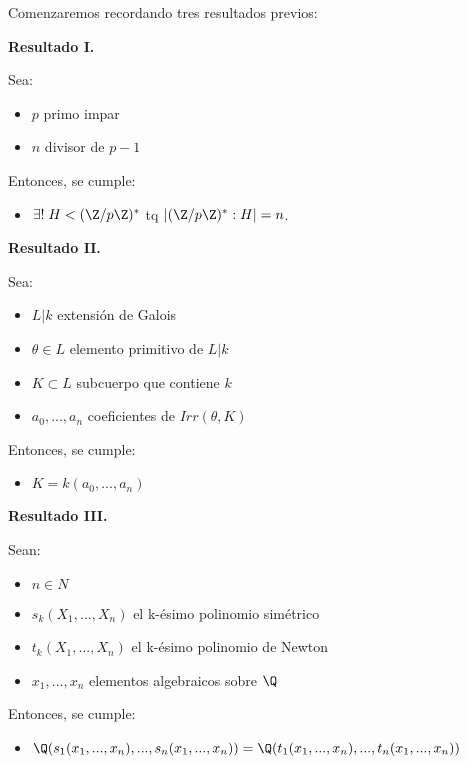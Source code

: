\documentclass[a5paper]{article}
\begin{document}
{
Comenzaremos recordando tres resultados previos:

{\bf Resultado I.} 

Sea:
\begin{itemize}
\item $p$ primo impar
\item $n$ divisor de $p-1$
\end{itemize}

Entonces, se cumple:
\begin{itemize}
\item $\exists !\; H < (\Z/p\Z)^* $ tq $ |(\Z/p\Z)^*:H| = n$.
\end{itemize}

{\bf Resultado II.} 

Sea:
\begin{itemize}
\item $L|k$ extensión de Galois
\item $\theta \in L$ elemento primitivo de $L|k$
\item $K \subset L$ subcuerpo que contiene $k$
\item $a_0,...,a_n$ coeficientes de $Irr(\theta,K)$
\end{itemize}

Entonces, se cumple:
\begin{itemize}
\item $K = k(a_0,...,a_n)$
\end{itemize}

{\bf Resultado III.} 

Sean:
\begin{itemize}
\item $n \in N$
\item $s_k(X_1,...,X_n)$ el k-ésimo polinomio simétrico
\item $t_k(X_1,...,X_n)$ el k-ésimo polinomio de Newton
\item $x_1,...,x_n$ elementos algebraicos sobre $\Q$
\end{itemize}

Entonces, se cumple:
\begin{itemize}
\item $\Q(s_1(x_1,...,x_n),...,s_n(x_1,...,x_n)) = \Q(t_1(x_1,...,x_n),...,t_n(x_1,...,x_n))$
\end{itemize}
}
\newpage
\end{document}
